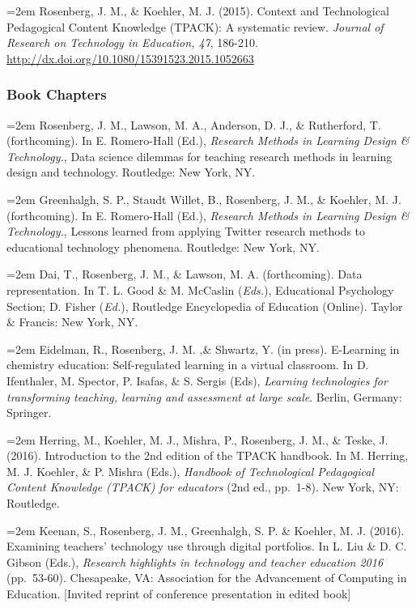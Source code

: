 \documentclass[14,]{article}
\begin{document}
\hangindent=2em Rosenberg, J. M., \& Koehler, M. J. (2015). Context and
Technological Pedagogical Content Knowledge (TPACK): A systematic
review. \emph{Journal of Research on Technology in Education, 47},
186-210. \url{http://dx.doi.org/10.1080/15391523.2015.1052663}

\subsubsection{Book Chapters}\label{book-chapters}

\hangindent=2em Rosenberg, J. M., Lawson, M. A., Anderson, D. J., \&
Rutherford, T. (forthcoming). In E. Romero-Hall (Ed.), \emph{Research
Methods in Learning Design \& Technology.}, Data science dilemmas for
teaching research methods in learning design and technology. Routledge:
New York, NY.

\hangindent=2em Greenhalgh, S. P., Staudt Willet, B., Rosenberg, J. M.,
\& Koehler, M. J. (forthcoming). In E. Romero-Hall (Ed.), \emph{Research
Methods in Learning Design \& Technology.}, Lessons learned from
applying Twitter research methods to educational technology phenomena.
Routledge: New York, NY.

\hangindent=2em Dai, T., Rosenberg, J. M., \& Lawson, M. A.
(forthcoming). Data representation. In T. L. Good \& M. McCaslin
(\emph{Eds.}), Educational Psychology Section; D. Fisher (\emph{Ed.}),
Routledge Encyclopedia of Education (Online). Taylor \& Francis: New
York, NY.

\hangindent=2em Eidelman, R., Rosenberg, J. M. ,\& Shwartz, Y. (in
press). E-Learning in chemistry education: Self-regulated learning in a
virtual classroom. In D. Ifenthaler, M. Spector, P. Isafas, \& S. Sergis
(Eds), \emph{Learning technologies for transforming teaching, learning
and assessment at large scale}. Berlin, Germany: Springer.

\hangindent=2em Herring, M., Koehler, M. J., Mishra, P., Rosenberg, J.
M., \& Teske, J. (2016). Introduction to the 2nd edition of the TPACK
handbook. In M. Herring, M. J. Koehler, \& P. Mishra (Eds.),
\emph{Handbook of Technological Pedagogical Content Knowledge (TPACK)
for educators} (2nd ed., pp.~1-8). New York, NY: Routledge.

\hangindent=2em Keenan, S., Rosenberg, J. M., Greenhalgh, S. P. \&
Koehler, M. J. (2016). Examining teachers' technology use through
digital portfolios. In L. Liu \& D. C. Gibson (Eds.), \emph{Research
highlights in technology and teacher education 2016} (pp.~53-60).
Chesapeake, VA: Association for the Advancement of Computing in
Education. {[}Invited reprint of conference presentation in edited
book{]}
\end{document}
